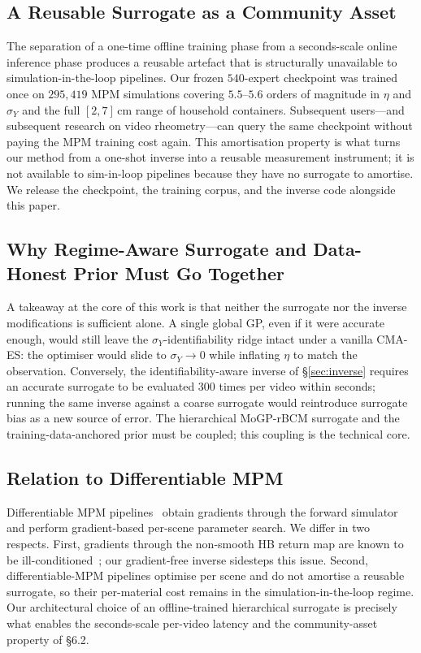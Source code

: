 \subsection{A Reusable Surrogate as a Community Asset}

The separation of a one-time offline training phase from a
seconds-scale online inference phase produces a reusable artefact
that is structurally unavailable to simulation-in-the-loop pipelines.
Our frozen $540$-expert checkpoint was trained once on
$295{,}419$ MPM simulations covering $5.5$--$5.6$ orders of magnitude
in $\eta$ and $\sigma_Y$ and the full $[2, 7]\,\mathrm{cm}$ range of
household containers. Subsequent users---and subsequent research on
video rheometry---can query the same checkpoint without paying the
MPM training cost again. This amortisation property is what turns
our method from a one-shot inverse into a reusable measurement
instrument; it is not available to sim-in-loop pipelines because
they have no surrogate to amortise. We release the checkpoint, the
training corpus, and the inverse code alongside this paper.

\subsection{Why Regime-Aware Surrogate and Data-Honest Prior Must Go
Together}

A takeaway at the core of this work is that neither the surrogate
nor the inverse modifications is sufficient alone. A single global
GP, even if it were accurate enough, would still leave the
$\sigma_Y$-identifiability ridge intact under a vanilla CMA-ES: the
optimiser would slide to $\sigma_Y \to 0$ while inflating $\eta$ to
match the observation. Conversely, the identifiability-aware inverse
of \S\ref{sec:inverse} requires an accurate surrogate to be evaluated
$300$ times per video within seconds; running the same inverse
against a coarse surrogate would reintroduce surrogate bias as a new
source of error. The hierarchical MoGP-rBCM surrogate and the
training-data-anchored prior must be coupled; this coupling is the
technical core.

\subsection{Relation to Differentiable MPM}

Differentiable MPM pipelines~\cite{li2023pacnerf,eastman2024recovery}
obtain gradients through the forward simulator and perform
gradient-based per-scene parameter search. We differ in two
respects. First, gradients through the non-smooth HB return map are
known to be
ill-conditioned~\cite{huang2021plasticinelab}; our gradient-free
inverse sidesteps this issue. Second, differentiable-MPM pipelines
optimise per scene and do not amortise a reusable surrogate, so
their per-material cost remains in the simulation-in-the-loop
regime. Our architectural choice of an offline-trained hierarchical
surrogate is precisely what enables the seconds-scale per-video
latency and the community-asset property of \S6.2.


